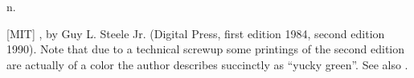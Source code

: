  n.

[MIT] , by Guy L. Steele Jr. (Digital Press, first edition 1984, second edition 1990). Note that due to
a technical screwup some printings of the second edition are actually of a color the author describes succinctly as ``yucky green''. See
also .

